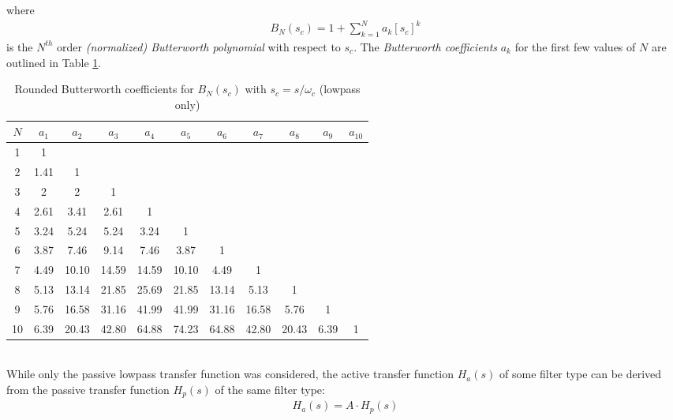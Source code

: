 \documentclass{report}
\begin{document}
where 
\begin{align}
    B_N(s_c) = 1 + \sum_{k=1}^{N} a_k [s_c]^k
\end{align}
is the $N^{th}$ order \emph{(normalized) Butterworth polynomial} with respect to $s_c$. The \emph{Butterworth coefficients} $a_k$ for the first 
few values of $N$ are outlined in Table \ref{butt_coeffs}.
\begin{table}[!hbt]
    \centering
    \caption{Rounded Butterworth coefficients for $B_N(s_c)$ with $s_c=s/\omega_c$ (lowpass only)}
    \label{butt_coeffs}
    \begin{tabular}{|c|c|c|c|c|c|c|c|c|c|c|}
        \hline
        $N$ & $a_1$ & $a_2$ & $a_3$ & $a_4$ & $a_5$ & $a_6$ & $a_7$ & $a_8$ & $a_9$ & $a_{10}$ \\
        \hline
        1 & 1 & & & & & & & & & \\
        \hline
        2 & 1.41 & 1 & & & & & & & & \\
        \hline
        3 & 2 & 2 & 1 & & & & & & & \\
        \hline
        4 & 2.61 & 3.41 & 2.61 & 1 & & & & & & \\
        \hline
        5 & 3.24 & 5.24 & 5.24 & 3.24 & 1 & & & & & \\
        \hline
        6 & 3.87 & 7.46 & 9.14 & 7.46 & 3.87 & 1 & & & & \\
        \hline
        7 & 4.49 & 10.10 & 14.59 & 14.59 & 10.10 & 4.49 & 1 & & & \\
        \hline
        8 & 5.13 & 13.14 & 21.85 & 25.69 & 21.85 & 13.14 & 5.13 & 1 & & \\
        \hline
        9 & 5.76 & 16.58 & 31.16 & 41.99 & 41.99 & 31.16 & 16.58 & 5.76 & 1 & \\
        \hline
        10 & 6.39 & 20.43 & 42.80 & 64.88 & 74.23 & 64.88 & 42.80 & 20.43 & 6.39 & 1 \\
        \hline
    \end{tabular}
\end{table}
\\
\noindent While only the passive lowpass transfer function was considered, the active transfer function $H_a(s)$ of some filter type can be derived from 
the passive transfer function $H_p(s)$ of the same filter type: 
\begin{align}
    H_{a}(s) = A\cdot H_{p}(s)
\end{align} 
\end{document}
